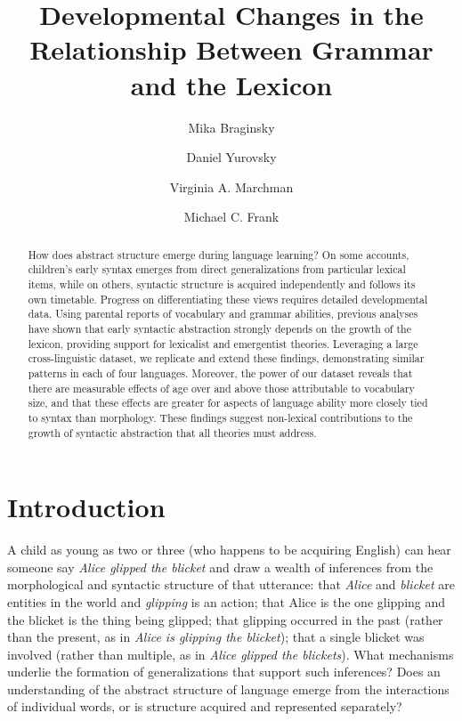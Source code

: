 \documentclass[authoryear, review]{elsarticle}
\date{}
\begin{document}
\begin{frontmatter}

\title{Developmental Changes in the Relationship Between Grammar and the
Lexicon}

\author[mb]{Mika Braginsky}
\author[dy]{Daniel Yurovsky}
\author[vam]{Virginia A. Marchman}
\author[mcf]{Michael C. Frank}
\address{Department of Psychology, Stanford University, United States}


\begin{abstract}
How does abstract structure emerge during language learning? On some
accounts, children's early syntax emerges from direct generalizations
from particular lexical items, while on others, syntactic structure is
acquired independently and follows its own timetable. Progress on
differentiating these views requires detailed developmental data. Using
parental reports of vocabulary and grammar abilities, previous analyses
have shown that early syntactic abstraction strongly depends on the
growth of the lexicon, providing support for lexicalist and emergentist
theories. Leveraging a large cross-linguistic dataset, we replicate and
extend these findings, demonstrating similar patterns in each of four
languages. Moreover, the power of our dataset reveals that there are
measurable effects of age over and above those attributable to
vocabulary size, and that these effects are greater for aspects of
language ability more closely tied to syntax than morphology. These
findings suggest non-lexical contributions to the growth of syntactic
abstraction that all theories must address.
\end{abstract}

\begin{keyword}

\end{keyword}

\end{frontmatter}

\section{Introduction}\label{introduction}

A child as young as two or three (who happens to be acquiring English)
can hear someone say \emph{Alice glipped the blicket} and draw a wealth
of inferences from the morphological and syntactic structure of that
utterance: that \emph{Alice} and \emph{blicket} are entities in the
world and \emph{glipping} is an action; that Alice is the one glipping
and the blicket is the thing being glipped; that glipping occurred in
the past (rather than the present, as in \emph{Alice is glipping the
blicket}); that a single blicket was involved (rather than multiple, as
in \emph{Alice glipped the blickets}). What mechanisms underlie the
formation of generalizations that support such inferences? Does an
understanding of the abstract structure of language emerge from the
interactions of individual words, or is structure acquired and
represented separately?
\end{document}
